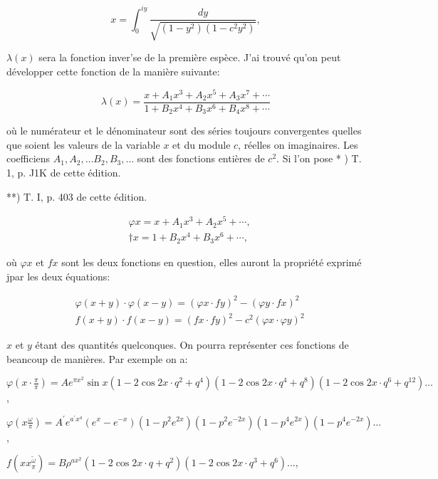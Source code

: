 \documentclass{article}
\begin{document}
\[
x=\int_{0}^{i y} \frac{d y}{\sqrt{\left(1-y^{2}\right)\left(1-c^{2} y^{2}\right)}},
\]

\(\lambda(x)\) sera la fonction inver'se de la première espèce. J'ai trouvé qu'on peut développer cette fonction de la manière suivante:

\[
\lambda(x)=\frac{x+A_{1} x^{3}+A_{2} x^{5}+A_{3} x^{7}+\cdots}{1+B_{2} x^{4}+B_{3} x^{6}+B_{4} x^{8}+\cdots}
\]

où le numérateur et le dénominateur sont des séries toujours convergentes quelles que soient les valeurs de la variable \(x\) et du module \(c\), réelles on imaginaires. Les coefficiens \(A_{1}, A_{2}, \ldots B_{2}, B_{3}, \ldots\) sont des fonctions entières de \(c^{2}\). Si l'on pose
* ) T. 1, p. J1K de cette édition.

**) T. I, p. 403 de cette édition.

\[
\begin{aligned}
& \varphi x=x+A_{1} x^{3}+A_{2} x^{5}+\cdots, \\
& \dagger x=1+B_{2} x^{4}+B_{3} x^{6}+\cdots,
\end{aligned}
\]

où \(\varphi x\) et \(f x\) sont les deux fonctions en question, elles auront la propriété exprimé jpar les deux équations:

\[
\begin{aligned}
& \varphi(x+y) \cdot \varphi(x-y)=(\varphi x \cdot f y)^{2}-(\varphi y \cdot f x)^{2} \\
& f(x+y) \cdot f(x-y)=(f x \cdot f y)^{2}-c^{2}(\varphi x \cdot \varphi y)^{2}
\end{aligned}
\]

\(x\) et \(y\) étant des quantités quelconques. On pourra représenter ces fonctions de beancoup de manières. Par exemple on a:

\(\varphi\left(x \cdot \frac{\pi}{\pi}\right)=A e^{\pi x^{2}} \sin x\left(1-2 \cos 2 x \cdot q^{2}+q^{4}\right)\left(1-2 \cos 2 x \cdot q^{4}+q^{8}\right)\left(1-2 \cos 2 x \cdot q^{6}+q^{12}\right) \ldots\),

\(\varphi\left(x \frac{\omega}{\pi}\right)=A^{\prime} e^{a^{\prime} x^{4}}\left(e^{x}-e^{-x}\right)\left(1-p^{2} e^{2 x}\right)\left(1-p^{2} e^{-2 x}\right)\left(1-p^{4} e^{2 x}\right)\left(1-p^{4} e^{-2 x}\right) \ldots\),

\(f\left(x x_{\pi}^{\tilde{\omega}}\right)=B \rho^{a x^{2}}\left(1-2 \cos 2 x \cdot q+q^{2}\right)\left(1-2 \cos 2 x \cdot q^{3}+q^{6}\right) \ldots\),
\end{document}
